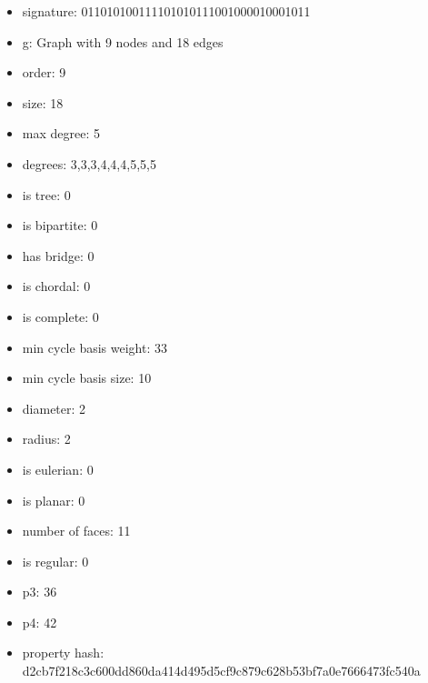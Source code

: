 \newpage
\begin{figure}
\end{figure}
\begin{itemize}
\item signature: 011010100111101010111001000010001011
\item g: Graph with 9 nodes and 18 edges
\item order: 9
\item size: 18
\item max degree: 5
\item degrees: 3,3,3,4,4,4,5,5,5
\item is tree: 0
\item is bipartite: 0
\item has bridge: 0
\item is chordal: 0
\item is complete: 0
\item min cycle basis weight: 33
\item min cycle basis size: 10
\item diameter: 2
\item radius: 2
\item is eulerian: 0
\item is planar: 0
\item number of faces: 11
\item is regular: 0
\item p3: 36
\item p4: 42
\item property hash: d2cb7f218c3c600dd860da414d495d5cf9c879c628b53bf7a0e7666473fc540a
\end{itemize}
